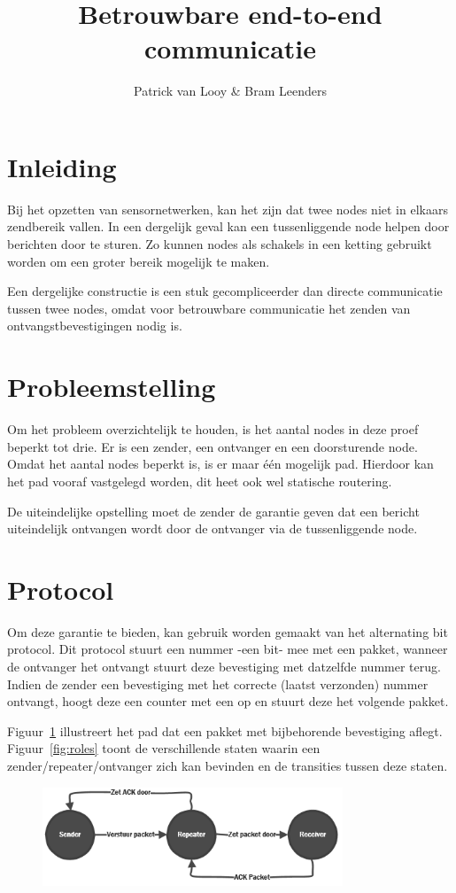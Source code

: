 \documentclass[a4paper,10pt]{article}
\title{Betrouwbare end-to-end communicatie}
\author{Patrick van Looy \& Bram Leenders}
\begin{document}
\maketitle

\section{Inleiding}
Bij het opzetten van sensornetwerken, kan het zijn dat twee nodes niet in elkaars zendbereik vallen. In een dergelijk geval kan een tussenliggende node helpen door berichten door te sturen. Zo kunnen nodes als schakels in een ketting gebruikt worden om een groter bereik mogelijk te maken.

Een dergelijke constructie is een stuk gecompliceerder dan directe communicatie tussen twee nodes, omdat voor betrouwbare communicatie het zenden van ontvangstbevestigingen nodig is.

\section{Probleemstelling}
Om het probleem overzichtelijk te houden, is het aantal nodes in deze proef beperkt tot drie. Er is een zender, een ontvanger en een doorsturende node. Omdat het aantal nodes beperkt is, is er maar \'e\'en mogelijk pad. Hierdoor kan het pad vooraf vastgelegd worden, dit heet ook wel statische routering.

De uiteindelijke opstelling moet de zender de garantie geven dat een bericht uiteindelijk ontvangen wordt door de ontvanger via de tussenliggende node. 

\section{Protocol}
Om deze garantie te bieden, kan gebruik worden gemaakt van het alternating bit protocol. Dit protocol stuurt een nummer -een bit- mee met een pakket, wanneer de ontvanger het ontvangt stuurt deze bevestiging met datzelfde nummer terug. Indien de zender een bevestiging met het correcte (laatst verzonden) nummer ontvangt, hoogt deze een counter met een op en stuurt deze het volgende pakket.

Figuur~\ref{fig:flow} illustreert het pad dat een pakket met bijbehorende bevestiging aflegt. Figuur~\ref{fig:roles} toont de verschillende staten waarin een zender/repeater/ontvanger zich kan bevinden en de transities tussen deze staten.

\begin{figure}[ht!]
    \centering
    \includegraphics[width=0.8\textwidth]{flow.png}
    \caption{}
    \label{fig:flow}
\end{figure}
\end{document}

